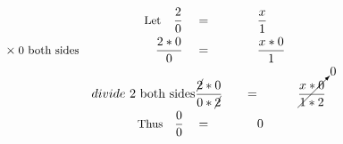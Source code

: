 \begin{alignat*}{5}
&\,&\small\text{Let}\normalsize\quad\frac{2}{0}\quad&=\quad&&\frac{x}{1}\\
&\times\small\text{0 both sides}&\frac{2*0}{0}\quad&=&&\frac{x*0}{1}\\
&\,\small &divide\text{ 2 both sides}&\frac{\cancel{2}*0}{0*\cancel{2}}\quad&=&&\cancelto{0}{\frac{x*0}{1*2}}\\
&\,&\small\text{Thus}\quad\frac{0}{0}\quad&=&&0
\end{alignat*}

